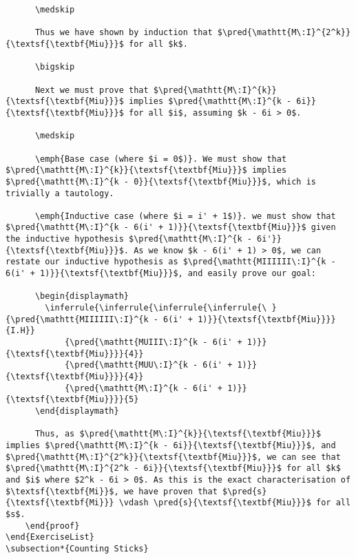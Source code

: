 \documentclass{book}
\begin{document}
\begin{verbatim}
      \medskip
      
      Thus we have shown by induction that $\pred{\mathtt{M\:I}^{2^k}}{\textsf{\textbf{Miu}}}$ for all $k$.
      
      \bigskip
      
      Next we must prove that $\pred{\mathtt{M\:I}^{k}}{\textsf{\textbf{Miu}}}$ implies $\pred{\mathtt{M\:I}^{k - 6i}}{\textsf{\textbf{Miu}}}$ for all $i$, assuming $k - 6i > 0$.
      
      \medskip
      
      \emph{Base case (where $i = 0$)}. We must show that  $\pred{\mathtt{M\:I}^{k}}{\textsf{\textbf{Miu}}}$ implies $\pred{\mathtt{M\:I}^{k - 0}}{\textsf{\textbf{Miu}}}$, which is trivially a tautology.
      
      \emph{Inductive case (where $i = i' + 1$)}. we must show that $\pred{\mathtt{M\:I}^{k - 6(i' + 1)}}{\textsf{\textbf{Miu}}}$ given the inductive hypothesis $\pred{\mathtt{M\:I}^{k - 6i'}}{\textsf{\textbf{Miu}}}$. As we know $k - 6(i' + 1) > 0$, we can restate our inductive hypothesis as $\pred{\mathtt{MIIIIII\:I}^{k - 6(i' + 1)}}{\textsf{\textbf{Miu}}}$, and easily prove our goal:
      
      \begin{displaymath}
        \inferrule{\inferrule{\inferrule{\inferrule{\ }{\pred{\mathtt{MIIIIII\:I}^{k - 6(i' + 1)}}{\textsf{\textbf{Miu}}}}{I.H}}
            {\pred{\mathtt{MUIII\:I}^{k - 6(i' + 1)}}{\textsf{\textbf{Miu}}}}{4}}
            {\pred{\mathtt{MUU\:I}^{k - 6(i' + 1)}}{\textsf{\textbf{Miu}}}}{4}}
            {\pred{\mathtt{M\:I}^{k - 6(i' + 1)}}{\textsf{\textbf{Miu}}}}{5}
      \end{displaymath}

      Thus, as $\pred{\mathtt{M\:I}^{k}}{\textsf{\textbf{Miu}}}$ implies $\pred{\mathtt{M\:I}^{k - 6i}}{\textsf{\textbf{Miu}}}$, and $\pred{\mathtt{M\:I}^{2^k}}{\textsf{\textbf{Miu}}}$, we can see that $\pred{\mathtt{M\:I}^{2^k - 6i}}{\textsf{\textbf{Miu}}}$ for all $k$ and $i$ where $2^k - 6i > 0$. As this is the exact characterisation of $\textsf{\textbf{Mi}}$, we have proven that $\pred{s}{\textsf{\textbf{Mi}}} \vdash \pred{s}{\textsf{\textbf{Miu}}}$ for all $s$.
    \end{proof}
\end{ExerciseList}
\subsection*{Counting Sticks}


\end{verbatim}
\end{document}
